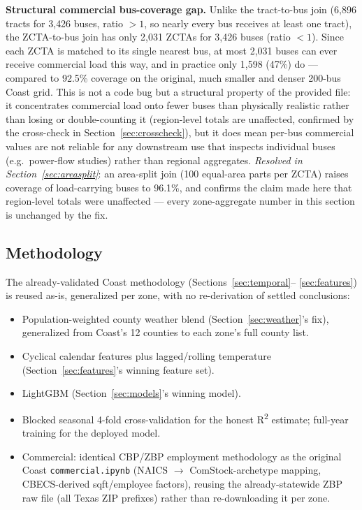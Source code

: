 \documentclass[11pt]{article}
\begin{document}
\textbf{Structural commercial bus-coverage gap.} Unlike the tract-to-bus join
(6{,}896 tracts for 3{,}426 buses, ratio $>1$, so nearly every bus receives at least
one tract), the ZCTA-to-bus join has only 2{,}031 ZCTAs for 3{,}426 buses (ratio
$<1$). Since each ZCTA is matched to its single nearest bus, at most 2{,}031 buses can
ever receive commercial load this way, and in practice only 1{,}598 (47\%) do ---
compared to 92.5\% coverage on the original, much smaller and denser 200-bus Coast
grid. This is not a code bug but a structural property of the provided file: it
concentrates commercial load onto fewer buses than physically realistic rather than
losing or double-counting it (region-level totals are unaffected, confirmed by the
cross-check in Section~\ref{sec:crosscheck}), but it does mean per-bus commercial
values are not reliable for any downstream use that inspects individual buses (e.g.\
power-flow studies) rather than regional aggregates. \emph{Resolved in
Section~\ref{sec:areasplit}}: an area-split join (100 equal-area parts per ZCTA) raises
coverage of load-carrying buses to 96.1\%, and confirms the claim made here that
region-level totals were unaffected --- every zone-aggregate number in this section is
unchanged by the fix.

\subsection{Methodology}

The already-validated Coast methodology (Sections~\ref{sec:temporal}--%
\ref{sec:features}) is reused as-is, generalized per zone, with no re-derivation of
settled conclusions:

\begin{itemize}
    \item Population-weighted county weather blend (Section~\ref{sec:weather}'s fix),
    generalized from Coast's 12 counties to each zone's full county list.
    \item Cyclical calendar features plus lagged/rolling temperature
    (Section~\ref{sec:features}'s winning feature set).
    \item LightGBM (Section~\ref{sec:models}'s winning model).
    \item Blocked seasonal 4-fold cross-validation for the honest R\textsuperscript{2}
    estimate; full-year training for the deployed model.
    \item Commercial: identical CBP/ZBP employment methodology as the original Coast
    \texttt{commercial.ipynb} (NAICS $\rightarrow$ ComStock-archetype mapping,
    CBECS-derived sqft/employee factors), reusing the already-statewide ZBP raw file
    (all Texas ZIP prefixes) rather than re-downloading it per zone.
\end{itemize}
\end{document}
